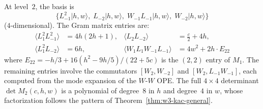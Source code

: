 \begin{computation}
\label{comp:w3-gram-level2}
At level~$2$, the basis is
\[
\{L_{-1}^2|h,w\rangle,\; L_{-2}|h,w\rangle,\;
W_{-1}L_{-1}|h,w\rangle,\; W_{-2}|h,w\rangle\}
\]
($4$-dimensional).  The Gram matrix entries are:
\begin{align}
\langle L_1^2 L_{-1}^2\rangle &= 4h(2h+1), &
\langle L_2 L_{-2}\rangle &= \tfrac{c}{2} + 4h, \nonumber \\
\langle L_1^2 L_{-2}\rangle &= 6h, &
\langle W_1 L_1 W_{-1} L_{-1}\rangle &= 4w^2 + 2h \cdot E_{22}
  \nonumber
\end{align}
where $E_{22} = -h/3 + 16(h^2-9h/5)/(22+5c)$ is the $(2,2)$
entry of $M_1$.  The remaining entries involve the commutators
$[W_2, W_{-2}]$ and $[W_2, L_{-1}W_{-1}]$, each computed from
the mode expansion of the $W$-$W$ OPE.  The full $4 \times 4$
determinant $\det M_2(c,h,w)$ is a polynomial of degree~$8$ in $h$
and degree~$4$ in $w$, whose factorization follows the pattern of
Theorem~\ref{thm:w3-kac-general}.
\end{computation}

